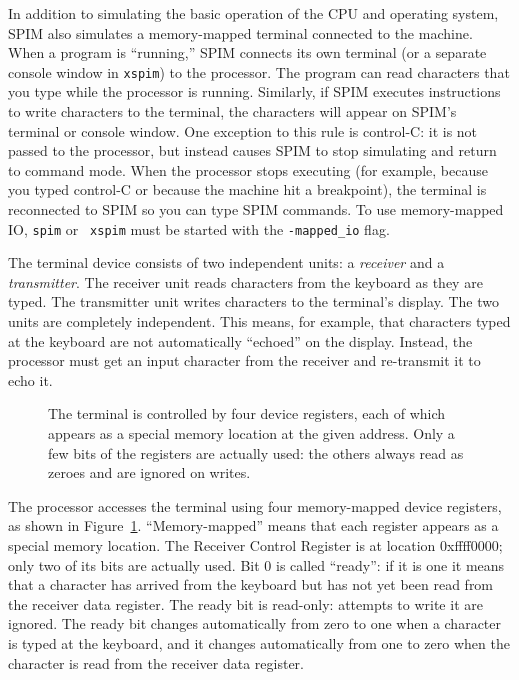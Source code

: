 \documentclass[11pt]{article}
\begin{document}
In addition to simulating the basic operation of the CPU and operating
system, SPIM also simulates a memory-mapped terminal connected to the
machine.  When a program is ``running,'' SPIM connects its own
terminal (or a separate console window in {\tt xspim}) to the
processor.  The program can read characters that you type while the
processor is running.  Similarly, if SPIM executes instructions to
write characters to the terminal, the characters will appear on SPIM's
terminal or console window.  One exception to this rule is control-C:
it is not passed to the processor, but instead causes SPIM to stop
simulating and return to command mode.  When the processor stops
executing (for example, because you typed control-C or because the
machine hit a breakpoint), the terminal is reconnected to SPIM so you
can type SPIM commands.  To use memory-mapped IO, {\tt spim} or {\tt
xspim} must be started with the {\tt -mapped\_io} flag.

The terminal device consists of two independent units: a {\em
receiver\/} and a {\em transmitter\/}.  The receiver unit reads
characters from the keyboard as they are typed.  The transmitter unit
writes characters to the terminal's display.  The two units are
completely independent.  This means, for example, that characters
typed at the keyboard are not automatically ``echoed'' on the display.
Instead, the processor must get an input character from the receiver
and re-transmit it to echo it.

\begin{figure}
  \centerline{}
  \caption{The terminal is controlled by four device registers,
each of which appears as a special memory location at the given
address.  Only a few bits of the registers are actually used: the
others always read as zeroes and are ignored on writes.}
  \label{fig:io_reg}
\end{figure}

The processor accesses the terminal using four memory-mapped device
registers, as shown in Figure~\ref{fig:io_reg}.  ``Memory-mapped''
means that each register appears as a special memory location.  The
Receiver Control Register is at location 0xf{f}f{f}0000; only two of its
bits are actually used.  Bit 0 is called ``ready'': if it is one it
means that a character has arrived from the keyboard but has not yet
been read from the receiver data register.  The ready bit is
read-only: attempts to write it are ignored.  The ready bit changes
automatically from zero to one when a character is typed at the
keyboard, and it changes automatically from one to zero when the
character is read from the receiver data register.
\end{document}
